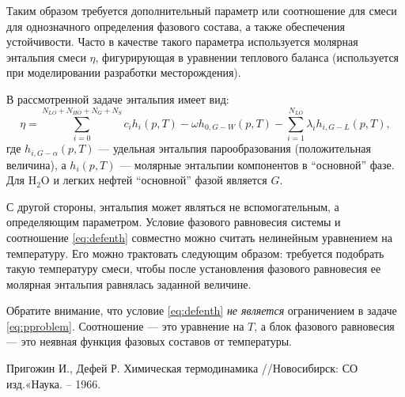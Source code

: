 \documentclass[12pt]{article}
\begin{document}
Таким образом требуется дополнительный параметр или соотношение для смеси для однозначного определения фазового состава, а также обеспечения устойчивости. Часто в качестве такого параметра используется молярная энтальпия смеси $\eta$, фигурирующая в уравнении теплового баланса (используется при моделировании разработки месторождения).

В рассмотренной задаче энтальпия имеет вид:
\begin{equation}
\eta = 
\sum_{i=0}^{N_{LO}+N_{HO}+N_{G}+N_{S}} c_i h_i(p,T) -\omega h_{0,G-W}(p,T) -\sum_{i=1}^{N_{LO}} \lambda_i h_{i,G-L}(p,T) 
,
\label{eq:defenth}
\end{equation}
где $h_{i,G-\alpha}(p,T)$ --- удельная энтальпия парообразования (положительная величина), а $h_i(p,T)$ --- молярные энтальпии компонентов в ``основной'' фазе. Для $\mathrm{H_2O}$ и легких нефтей ``основной'' фазой является $G$.

С другой стороны, энтальпия может являться не вспомогательным, а определяющим параметром. Условие фазового равновесия системы и соотношение \eqref{eq:defenth} совместно можно считать нелинейным уравнением на температуру. Его можно трактовать следующим образом: требуется подобрать такую температуру смеси, чтобы после установления фазового равновесия ее молярная энтальпия равнялась заданной величине.

Обратите внимание, что условие \eqref{eq:defenth} \emph{не является} ограничением в задаче \eqref{eq:pproblem}. Соотношение --- это уравнение на $T$, а блок фазового равновесия --- это неявная функция фазовых составов от температуры.


\begin{thebibliography}{9}
     Пригожин И., Дефей Р. Химическая термодинамика //Новосибирск: СО изд.«Наука. – 1966.
\end{thebibliography}
\end{document}
